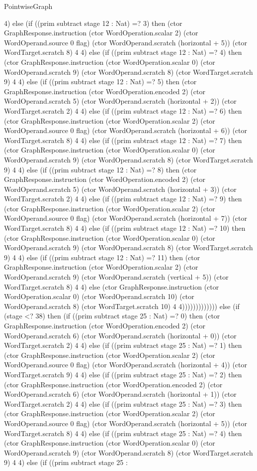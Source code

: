 \begin{lexlean}{PointwiseGraph}
\begin{semanticmodule}
{4) else (if ((prim subtract stage 12 : Nat) =? 3) then (ctor GraphResponse.instruction (ctor WordOperation.scalar 2) (ctor WordOperand.source 0 flag) (ctor WordOperand.scratch (horizontal + 5)) (ctor WordTarget.scratch 8) 4 4) else (if ((prim subtract stage 12 : Nat) =? 4) then (ctor GraphResponse.instruction (ctor WordOperation.scalar 0) (ctor WordOperand.scratch 9) (ctor WordOperand.scratch 8) (ctor WordTarget.scratch 9) 4 4) else (if ((prim subtract stage 12 : Nat) =? 5) then (ctor GraphResponse.instruction (ctor WordOperation.encoded 2) (ctor WordOperand.scratch 5) (ctor WordOperand.scratch (horizontal + 2)) (ctor WordTarget.scratch 2) 4 4) else (if ((prim subtract stage 12 : Nat) =? 6) then (ctor GraphResponse.instruction (ctor WordOperation.scalar 2) (ctor WordOperand.source 0 flag) (ctor WordOperand.scratch (horizontal + 6)) (ctor WordTarget.scratch 8) 4 4) else (if ((prim subtract stage 12 : Nat) =? 7) then (ctor GraphResponse.instruction (ctor WordOperation.scalar 0) (ctor WordOperand.scratch 9) (ctor WordOperand.scratch 8) (ctor WordTarget.scratch 9) 4 4) else (if ((prim subtract stage 12 : Nat) =? 8) then (ctor GraphResponse.instruction (ctor WordOperation.encoded 2) (ctor WordOperand.scratch 5) (ctor WordOperand.scratch (horizontal + 3)) (ctor WordTarget.scratch 2) 4 4) else (if ((prim subtract stage 12 : Nat) =? 9) then (ctor GraphResponse.instruction (ctor WordOperation.scalar 2) (ctor WordOperand.source 0 flag) (ctor WordOperand.scratch (horizontal + 7)) (ctor WordTarget.scratch 8) 4 4) else (if ((prim subtract stage 12 : Nat) =? 10) then (ctor GraphResponse.instruction (ctor WordOperation.scalar 0) (ctor WordOperand.scratch 9) (ctor WordOperand.scratch 8) (ctor WordTarget.scratch 9) 4 4) else (if ((prim subtract stage 12 : Nat) =? 11) then (ctor GraphResponse.instruction (ctor WordOperation.scalar 2) (ctor WordOperand.scratch 9) (ctor WordOperand.scratch (vertical + 5)) (ctor WordTarget.scratch 8) 4 4) else (ctor GraphResponse.instruction (ctor WordOperation.scalar 0) (ctor WordOperand.scratch 10) (ctor WordOperand.scratch 8) (ctor WordTarget.scratch 10) 4 4))))))))))))) else (if (stage <? 38) then (if ((prim subtract stage 25 : Nat) =? 0) then (ctor GraphResponse.instruction (ctor WordOperation.encoded 2) (ctor WordOperand.scratch 6) (ctor WordOperand.scratch (horizontal + 0)) (ctor WordTarget.scratch 2) 4 4) else (if ((prim subtract stage 25 : Nat) =? 1) then (ctor GraphResponse.instruction (ctor WordOperation.scalar 2) (ctor WordOperand.source 0 flag) (ctor WordOperand.scratch (horizontal + 4)) (ctor WordTarget.scratch 9) 4 4) else (if ((prim subtract stage 25 : Nat) =? 2) then (ctor GraphResponse.instruction (ctor WordOperation.encoded 2) (ctor WordOperand.scratch 6) (ctor WordOperand.scratch (horizontal + 1)) (ctor WordTarget.scratch 2) 4 4) else (if ((prim subtract stage 25 : Nat) =? 3) then (ctor GraphResponse.instruction (ctor WordOperation.scalar 2) (ctor WordOperand.source 0 flag) (ctor WordOperand.scratch (horizontal + 5)) (ctor WordTarget.scratch 8) 4 4) else (if ((prim subtract stage 25 : Nat) =? 4) then (ctor GraphResponse.instruction (ctor WordOperation.scalar 0) (ctor WordOperand.scratch 9) (ctor WordOperand.scratch 8) (ctor WordTarget.scratch 9) 4 4) else (if ((prim subtract stage 25 : }
\end{semanticmodule}
\end{lexlean}
